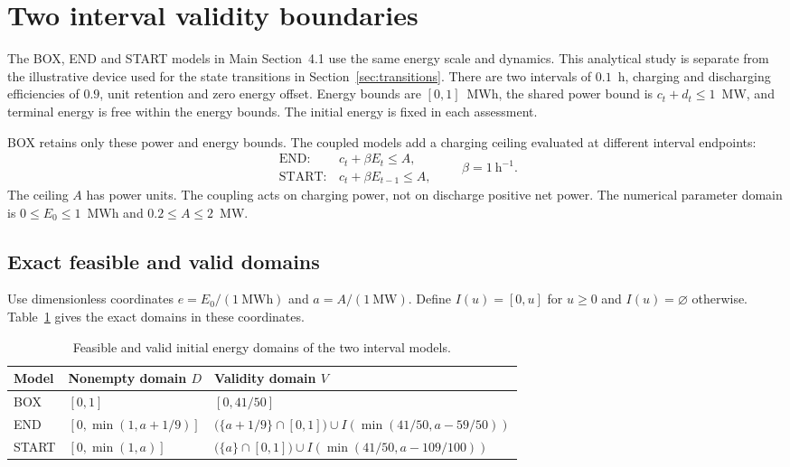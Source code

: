 \section{Two interval validity boundaries}\label{sec:boundaries}
The BOX, END and START models in Main Section~4.1 use the same energy
scale and dynamics. This analytical study is separate from the illustrative
device used for the state transitions in Section~\ref{sec:transitions}.
There are two intervals of $0.1$~h, charging and discharging efficiencies
of $0.9$, unit retention and zero energy offset. Energy bounds are
$[0,1]$~MWh, the shared power bound is $c_t+d_t\leq1$~MW, and terminal
energy is free within the energy bounds. The initial energy is fixed in
each assessment.

BOX retains only these power and energy bounds. The coupled models add
a charging ceiling evaluated at different interval endpoints:
\begin{equation}
\begin{array}{ll}
\mathrm{END}:&c_t+\beta E_t\leq A,\\
\mathrm{START}:&c_t+\beta E_{t-1}\leq A,
\end{array}
\qquad \beta=1~\mathrm{h}^{-1}.\label{eq:boundary_models}
\end{equation}
The ceiling $A$ has power units. The coupling acts on charging power,
not on discharge positive net power. The numerical parameter domain is
$0\leq E_0\leq1$~MWh and $0.2\leq A\leq2$~MW.

\subsection{Exact feasible and valid domains}
Use dimensionless coordinates $e=E_0/(1~\mathrm{MWh})$ and
$a=A/(1~\mathrm{MW})$. Define $I(u)=[0,u]$ for $u\geq0$ and
$I(u)=\varnothing$ otherwise. Table~\ref{tab:boundary_domains} gives
the exact domains in these coordinates.

\begin{table}[htbp]
\caption{Feasible and valid initial energy domains of the two interval models.}
\label{tab:boundary_domains}
\begin{tabularx}{\linewidth}{@{}l p{.25\linewidth} X@{}}
\toprule Model & Nonempty domain $D$ & Validity domain $V$\\\midrule
BOX & $[0,1]$ & $[0,41/50]$\\[4pt]
END & $[0,\min(1,a+1/9)]$ &
$\bigl(\{a+1/9\}\cap[0,1]\bigr)\cup I(\min(41/50,a-59/50))$\\[4pt]
START & $[0,\min(1,a)]$ &
$\bigl(\{a\}\cap[0,1]\bigr)\cup I(\min(41/50,a-109/100))$\\
\bottomrule\end{tabularx}
\end{table}

